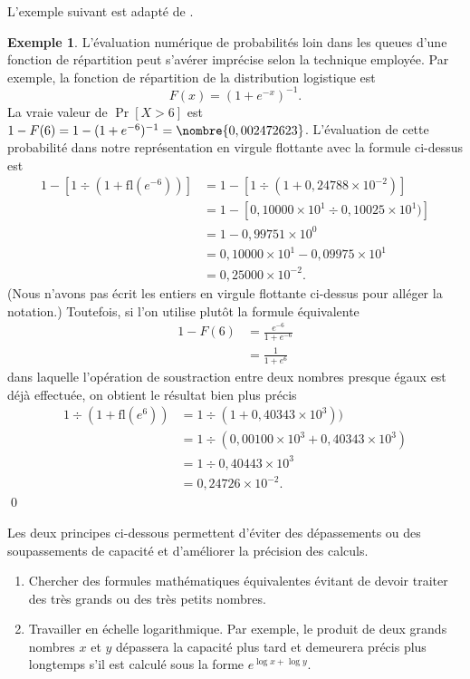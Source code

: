 \documentclass[letterpaper,11pt,english,french]{memoir}
\theoremstyle{plain}
\theoremstyle{definition}
\newtheorem{exemple}{Exemple}[chapter]
\theoremstyle{remark}
\newcommand{\fl}{\mathrm{fl}}
\begin{document}
L'exemple suivant est adapté de \cite{Monahan:numstat:2001}.

\begin{exemple}
  L'évaluation numérique de probabilités loin dans les queues d'une
  fonction de répartition peut s'avérer imprécise selon la technique
  employée. Par exemple, la fonction de répartition de la distribution
  logistique est
  \begin{equation*}
    F(x) = (1 + e^{-x})^{-1}.
  \end{equation*}
  La vraie valeur de $\operatorname{Pr}[X > 6]$ est $1 - F(6) = 1 - (1
  + e^{-6})^{-1} = \nombre{0,002472623}$. L'évaluation de cette
  probabilité dans notre représentation en virgule flottante avec la
  formule ci-dessus est
  \begin{align*}
    1 - [1 \div (1 + \fl(e^{-6}))]
    &= 1 - [1 \div (1 + 0,24788 \times 10^{-2})] \\
    &= 1 - [0,10000 \times 10^1 \div 0,10025 \times 10^1)] \\
    &= 1 - 0,99751 \times 10^0 \\
    &= 0,10000 \times 10^1 - 0,09975 \times 10^1 \\
    &= 0,25000 \times 10^{-2}.
  \end{align*}
  (Nous n'avons pas écrit les entiers en virgule flottante ci-dessus
  pour alléger la notation.) Toutefois, si l'on utilise plutôt la
  formule équivalente
  \begin{align*}
    1 - F(6)
    &= \frac{e^{-6}}{1 + e^{-6}} \\
    &= \frac{1}{1 + e^6}
  \end{align*}
  dans laquelle l'opération de soustraction entre deux nombres presque
  égaux est déjà effectuée, on obtient le résultat bien plus précis
  \begin{align*}
    1 \div (1 + \fl(e^6))
    &= 1 \div (1 + 0,40343 \times 10^3)) \\
    &= 1 \div (0,00100 \times 10^3 + 0,40343 \times 10^3) \\
    &= 1 \div 0,40443 \times 10^3 \\
    &= 0,24726 \times 10^{-2}.
  \end{align*}
  \qed
\end{exemple}

Les deux principes ci-dessous permettent d'éviter des dépassements ou
des soupassements de capacité et d'améliorer la précision des calculs.

\begin{enumerate}
\item Chercher des formules mathématiques équivalentes évitant de
  devoir traiter des très grands ou des très petits nombres.
\item Travailler en échelle logarithmique. Par exemple, le produit de
  deux grands nombres $x$ et $y$ dépassera la capacité plus tard et
  demeurera précis plus longtemps s'il est calculé sous la forme
  $e^{\log x + \log y}$.
\end{enumerate}
\end{document}
